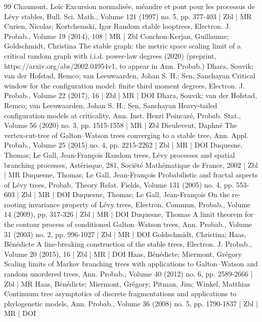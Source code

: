 \documentclass[10pt]{amsart}
\theoremstyle{definition}\newtheorem{defi}[theo]{Definition}\newtheorem{rema}[theo]{Remark}\newtheorem{exam}[theo]{Example}\newtheorem{exem}[theo]{Example}\newtheorem{nota}[theo]{Notation}
\begin{document}
\begin{thebibliography}{99}
Chaumont, Loïc Excursion normalisée, méandre et pont pour les processus de Lévy stables, Bull. Sci. Math., Volume 121 (1997) no. 5, pp. 377-403 | Zbl | MR
Curien, Nicolas; Kortchemski, Igor Random stable looptrees, Electron. J. Probab., Volume 19 (2014), 108 | MR | Zbl
Conchon-Kerjan, Guillaume; Goldschmidt, Christina The stable graph: the metric space scaling limit of a critical random graph with i.i.d. power-law degrees (2020) (preprint, https://arxiv.org/abs/2002.04954v1, to appear in Ann. Probab.)
Dhara, Souvik; van der Hofstad, Remco; van Leeuwaarden, Johan S. H.; Sen, Sanchayan Critical window for the configuration model: finite third moment degrees, Electron. J. Probab., Volume 22 (2017), 16 | Zbl | MR | DOI
Dhara, Souvik; van der Hofstad, Remco; van Leeuwaarden, Johan S. H.; Sen, Sanchayan Heavy-tailed configuration models at criticality, Ann. Inst. Henri Poincaré, Probab. Stat., Volume 56 (2020) no. 3, pp. 1515-1558 | MR | Zbl
Dieuleveut, Daphné The vertex-cut-tree of Galton–Watson trees converging to a stable tree, Ann. Appl. Probab., Volume 25 (2015) no. 4, pp. 2215-2262 | Zbl | MR | DOI
Duquesne, Thomas; Le Gall, Jean-François Random trees, Lévy processes and spatial branching processes, Astérisque, 281, Société Mathématique de France, 2002 | Zbl | MR
Duquesne, Thomas; Le Gall, Jean-François Probabilistic and fractal aspects of Lévy trees, Probab. Theory Relat. Fields, Volume 131 (2005) no. 4, pp. 553-603 | Zbl | MR | DOI
Duquesne, Thomas; Le Gall, Jean-François On the re-rooting invariance property of Lévy trees, Electron. Commun. Probab., Volume 14 (2009), pp. 317-326 | Zbl | MR | DOI
Duquesne, Thomas A limit theorem for the contour process of conditioned Galton–Watson trees, Ann. Probab., Volume 31 (2003) no. 2, pp. 996-1027 | Zbl | MR | DOI
Goldschmidt, Christina; Haas, Bénédicte A line-breaking construction of the stable trees, Electron. J. Probab., Volume 20 (2015), 16 | Zbl | MR | DOI
Haas, Bénédicte; Miermont, Grégory Scaling limits of Markov branching trees with applications to Galton–Watson and random unordered trees, Ann. Probab., Volume 40 (2012) no. 6, pp. 2589-2666 | Zbl | MR
Haas, Bénédicte; Miermont, Grégory; Pitman, Jim; Winkel, Matthias Continuum tree asymptotics of discrete fragmentations and applications to phylogenetic models, Ann. Probab., Volume 36 (2008) no. 5, pp. 1790-1837 | Zbl | MR | DOI

\end{thebibliography}
\end{document}
